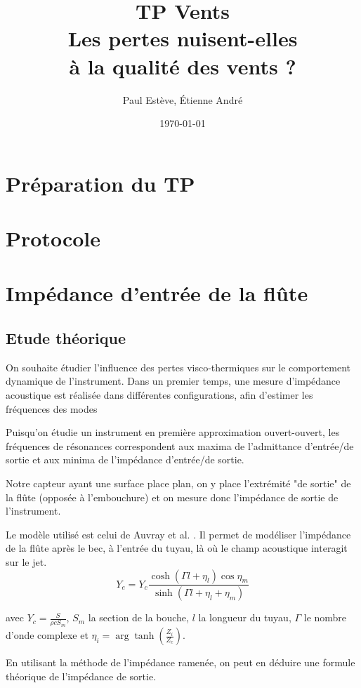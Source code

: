 \documentclass[atiam, article]{rapport} %
\title{TP Vents\\Les pertes nuisent-elles\\à la qualité des vents ?}
\author{Paul Estève, Étienne André} %
\date{\today}
\begin{document}
\maketitle


\section{Préparation du TP}


\section{Protocole}

\section{Impédance d'entrée de la flûte}

\subsection{Etude théorique}
\label{subsec:theorie}

On souhaite étudier l'influence des pertes visco-thermiques sur le comportement dynamique de l'instrument. Dans un premier temps, une mesure d'impédance acoustique est réalisée dans différentes configurations, afin d'estimer les fréquences des modes 

Puisqu'on étudie un instrument en première approximation ouvert-ouvert, les fréquences de résonances correspondent aux maxima de l'admittance d'entrée/de sortie et aux minima de l'impédance d'entrée/de sortie.

Notre capteur ayant une surface place plan, on y place l'extrémité "de sortie" de la flûte (opposée à l'embouchure) et on mesure donc l'impédance de sortie de l'instrument.

Le modèle utilisé est celui de Auvray et al. \cite{Auvray2011}. Il permet de modéliser l'impédance de la flûte après le bec, à l'entrée du tuyau, là où le champ acoustique interagit sur le jet.
$$Y_e=Y_c \frac{\cosh \left(\Gamma l+\eta_l\right) \cos \eta_m}{\sinh \left(\Gamma l+\eta_l+\eta_m\right)}$$

avec $Y_c = \frac{S}{\rho c S_m}$, $S_m$ la section de la bouche, $l$ la longueur du tuyau, $\Gamma$ le nombre d'onde complexe et $\eta_i = \arg \tanh\left(\frac{Z_i}{Z_c}\right)$.

En utilisant la méthode de l'impédance ramenée, on peut en déduire une formule théorique de l'impédance de sortie.
\end{document}
